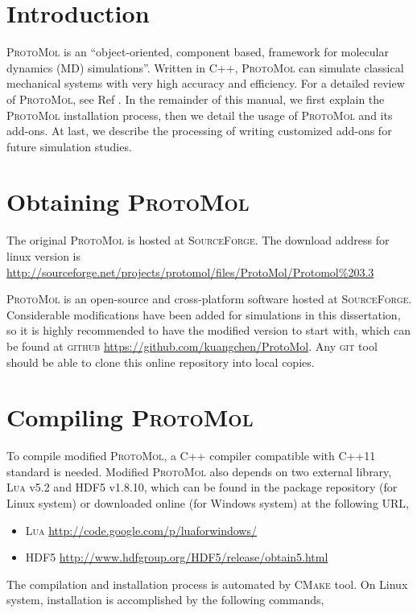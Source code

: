 \documentclass[10pt,a4paper]{article}
\begin{document}
\section{Introduction}
\textsc{ProtoMol} is an ``object-oriented, component based, framework for molecular dynamics (MD) simulations''. Written in \textsc{C++}, \textsc{ProtoMol} can simulate classical mechanical systems with very high accuracy and efficiency. For a detailed review of \textsc{ProtoMol}, see Ref \cite{Matthey2004}. In the remainder of this manual, we first explain the \textsc{ProtoMol} installation process, then we detail the usage of \textsc{ProtoMol} and its add-ons. At last, we describe the processing of writing customized add-ons for future simulation studies.

\section{Obtaining \textsc{ProtoMol}}
The original \textsc{ProtoMol} is hosted at \textsc{SourceForge}. The download address for linux version is 
\url{http://sourceforge.net/projects/protomol/files/ProtoMol/Protomol\%203.3}

\textsc{ProtoMol} is an open-source and cross-platform software hosted at \textsc{SourceForge}. Considerable modifications have been added for simulations in this dissertation, so it is highly recommended to have the modified version to start with, which can be found at \textsc{github} \url{https://github.com/kuangchen/ProtoMol}. Any \textsc{git} tool should be able to clone this online repository into local copies. 

\section{Compiling \textsc{ProtoMol}}
To compile modified \textsc{ProtoMol}, a \textsc{C++} compiler compatible with \textsc{C++11} standard is needed. Modified \textsc{ProtoMol} also depends on two external library, \textsc{Lua} v5.2 and \textsc{HDF5} v1.8.10, which can be found in the package repository (for Linux system) or downloaded online (for Windows system) at the following URL,
\begin{itemize}
\item \textsc{Lua} \url{http://code.google.com/p/luaforwindows/}
\item \textsc{HDF5} \url{http://www.hdfgroup.org/HDF5/release/obtain5.html}
\end{itemize}

The compilation and installation process is automated by \textsc{CMake} tool. On Linux system, installation is accomplished by the following commands, 
\end{document}
